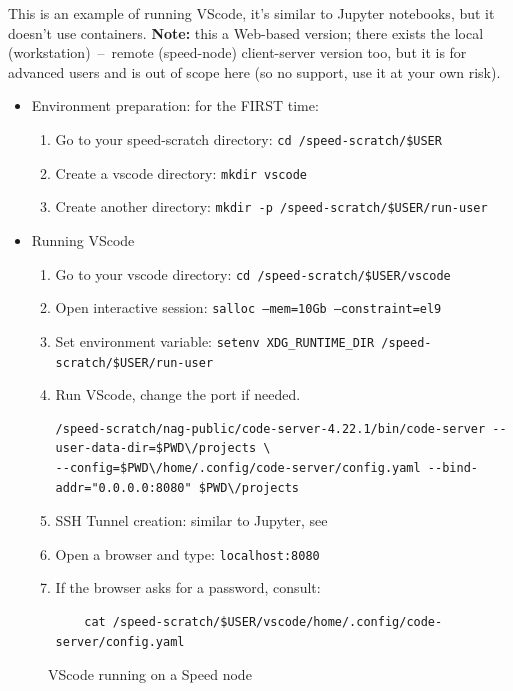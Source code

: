 This is an example of running VScode, it's similar to Jupyter notebooks, but
it doesn't use containers. \textbf{Note:} this a Web-based version; there exists the local
(workstation)~--~remote (speed-node) client-server version too, but it is for advanced users
and is out of scope here (so no support, use it at your own risk).

\begin{itemize}
\item Environment preparation: for the FIRST time:
\begin{enumerate}
    \item Go to your speed-scratch directory: \texttt{cd /speed-scratch/\$USER}
    \item Create a vscode directory: \texttt{mkdir vscode}
    \item Create another directory: \texttt{mkdir -p /speed-scratch/\$USER/run-user}
\end{enumerate}

\item Running VScode
\begin{enumerate}
    \item Go to your vscode directory:
    \texttt{cd /speed-scratch/\$USER/vscode}
    \item Open interactive session:
    \texttt{salloc --mem=10Gb --constraint=el9}
    \item Set environment variable:
    \texttt{setenv XDG\_RUNTIME\_DIR /speed-scratch/\$USER/run-user}
    \item Run VScode, change the port if needed.
    \scriptsize
    \begin{verbatim}
/speed-scratch/nag-public/code-server-4.22.1/bin/code-server --user-data-dir=$PWD\/projects \
--config=$PWD\/home/.config/code-server/config.yaml --bind-addr="0.0.0.0:8080" $PWD\/projects
    \end{verbatim}
    \normalsize
    \item SSH Tunnel creation: similar to Jupyter, see 
    \item Open a browser and type: \texttt{localhost:8080}
    \item If the browser asks for a password, consult:
    \begin{verbatim}
    cat /speed-scratch/$USER/vscode/home/.config/code-server/config.yaml
    \end{verbatim}
\end{enumerate}
\end{itemize}

\begin{figure}[htbp]
	\centering
	\caption{VScode running on a Speed node}
	\label{fig:vscode}
\end{figure}
